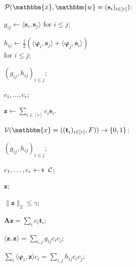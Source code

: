 \documentclass[../../book.tex]{subfiles}
\begin{document}
\begin{algoproto}[ht]
    \small
    \centering
    \setlength{\fboxsep}{1.5pt}
    \begin{mdframed}[linecolor=black, linewidth=1pt,
                     skipabove=10pt, skipbelow=10pt,
                     innerleftmargin=5pt, innerrightmargin=5pt]
        \begin{minipage}[t]{0.43\linewidth}
            \colorbox{oc-blue-1}{$\mathcal{P}(\mathbbm{x}, \mathbbm{w} = (\mathbf{s}_i)_{i \in [r]})$:}
            \begin{algoen}
                \item \colorbox{oc-orange-1}{$g_{ij} \gets \langle \mathbf{s}_i, \mathbf{s}_j \rangle$ for $i \leq j$;}
                \item \colorbox{oc-orange-1}{$h_{ij} \gets \frac{1}{2}(\langle \boldsymbol{\varphi}_i, \mathbf{s}_j \rangle + \langle \boldsymbol{\varphi}_j, \mathbf{s}_i \rangle)$} \\ \colorbox{oc-orange-1}{for $i \leq j$;}
                \item {} \colorbox{oc-orange-1}{$(g_{ij}, h_{ij})_{i \leq j}$};
                \item {} $c_1, \dots, c_r$;
                \item {} $\mathbf{z} \gets \sum_{i \in [r]} c_i\mathbf{s}_i$.
            \end{algoen}
        \end{minipage}
        \hfill
        \begin{minipage}[t]{0.54\linewidth}
            \colorbox{oc-blue-1}{$\mathcal{V}(\mathbbm{x} = ((\mathbf{t}_i)_{i \in [r]}, F)) \to \{0,1\}$:}
            \begin{algoen}
                \item {} $(g_{ij}, h_{ij})_{i \leq j}$;
                \item {} $c_1, \dots, c_r \leftarrowS \mathcal{C}$;
                \item {} $\mathbf{z}$;
                \item {} $\|\mathbf{z}\|_2 \leq \gamma$;
                \item {} $\mathbf{A}\mathbf{z} = \sum_{i} c_i\mathbf{t}_i$;
                \item \colorbox{oc-orange-1}{ $\langle \mathbf{z}, \mathbf{z} \rangle = \sum_{i,j} g_{ij}c_ic_j$;}
                \item \colorbox{oc-orange-1}{ $\sum_{i} \langle \boldsymbol{\varphi}_i, \mathbf{z} \rangle c_i = \sum_{i,j} h_{ij}c_ic_j$;}

\end{algoen}
\end{minipage}
\end{mdframed}
\end{algoproto}
\end{document}
